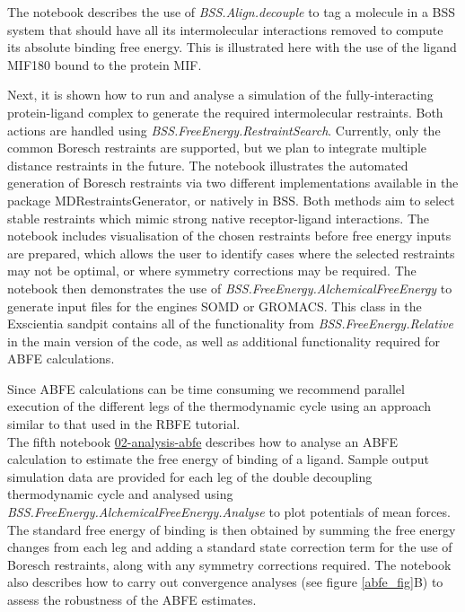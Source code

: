 The notebook describes the use of \textit{BSS.Align.decouple} to tag a molecule in a BSS system that should have all its intermolecular interactions removed to compute its absolute binding free energy. This is illustrated here with the use of the ligand MIF180 bound to the protein MIF.\cite{Qian2019, Clark2023} 

Next, it is shown how to run and analyse a simulation of the fully-interacting protein-ligand complex to generate the required intermolecular restraints. Both actions are handled using \textit{BSS.FreeEnergy.RestraintSearch}. Currently, only the common Boresch restraints are supported,\cite{boresch_absolute_2003} but we plan to integrate multiple distance restraints in the future.\cite{Clark2023} 
The notebook illustrates the automated generation of Boresch restraints via two different implementations available in the package MDRestraintsGenerator,\cite{alibay_evaluating_2022, alibay_ialibaymdrestraintsgenerator_2021} or natively in BSS. Both methods aim to select stable restraints which mimic strong native receptor-ligand interactions. The notebook includes visualisation of the chosen restraints before free energy inputs are prepared, which allows the user to identify cases where the selected restraints may not be optimal, or where symmetry corrections may be required.\cite{duboue-dijon_building_2021} The notebook then demonstrates the use of \textit{BSS.FreeEnergy.AlchemicalFreeEnergy} to generate input files for the engines SOMD or GROMACS. This class in the Exscientia sandpit contains all of the functionality from \textit{BSS.FreeEnergy.Relative} in the main version of the code, as well as additional functionality required for ABFE calculations.

Since ABFE calculations can be time consuming we recommend parallel execution of the different legs of the thermodynamic cycle using an approach similar to that used in the RBFE tutorial.
\\

The fifth notebook \href{https://github.com/OpenBioSim/BioSimSpaceTutorials/blob/main/04_fep/03_ABFE/02_analysis_abfe.ipynb}{02-analysis-abfe} describes how to analyse an ABFE calculation to estimate the free energy of binding of a ligand. Sample output simulation data are provided for each leg of the double decoupling thermodynamic cycle and analysed using \textit{BSS.FreeEnergy.AlchemicalFreeEnergy.Analyse} to plot potentials of mean forces. The standard free energy of binding is then obtained by summing the free energy changes from each leg and adding a standard state correction term for the use of Boresch restraints, along with any symmetry corrections required. The notebook also describes how to carry out convergence analyses (see figure \ref{abfe_fig}B) to assess the robustness of the ABFE estimates.  

